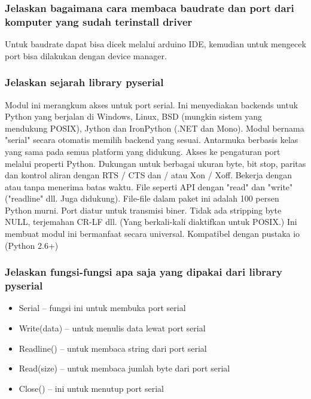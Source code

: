 \subsubsection{Jelaskan bagaimana cara membaca baudrate dan port dari komputer yang sudah terinstall driver}
Untuk baudrate dapat bisa dicek melalui arduino IDE, kemudian untuk mengecek port bisa dilakukan dengan device manager.

\subsubsection{Jelaskan sejarah library pyserial}
Modul ini merangkum akses untuk port serial. Ini menyediakan backends untuk Python yang berjalan di Windows, Linux, BSD (mungkin sistem yang mendukung POSIX), Jython dan IronPython (.NET dan Mono). Modul bernama "serial" secara otomatis memilih backend yang sesuai. Antarmuka berbasis kelas yang sama pada semua platform yang didukung.
Akses ke pengaturan port melalui properti Python. Dukungan untuk berbagai ukuran byte, bit stop, paritas dan kontrol aliran dengan RTS / CTS dan / atau Xon / Xoff. Bekerja dengan atau tanpa menerima batas waktu.
File seperti API dengan "read" dan "write" ("readline" dll. Juga didukung). File-file dalam paket ini adalah 100 persen Python murni. Port diatur untuk transmisi biner. Tidak ada stripping byte NULL, terjemahan CR-LF dll. (Yang berkali-kali diaktifkan untuk POSIX.) Ini membuat modul ini bermanfaat secara universal. Kompatibel dengan pustaka io (Python 2.6+)

\subsubsection{Jelaskan fungsi-fungsi apa saja yang dipakai dari library pyserial}
\begin{itemize}
    \item Serial – fungsi ini untuk membuka port serial
    \item Write(data) – untuk menulis data lewat port serial
    \item Readline() – untuk membaca string dari port serial
    \item Read(size) – untuk membaca jumlah byte dari port serial
    \item Close() – ini untuk menutup port serial 
\end{itemize}

